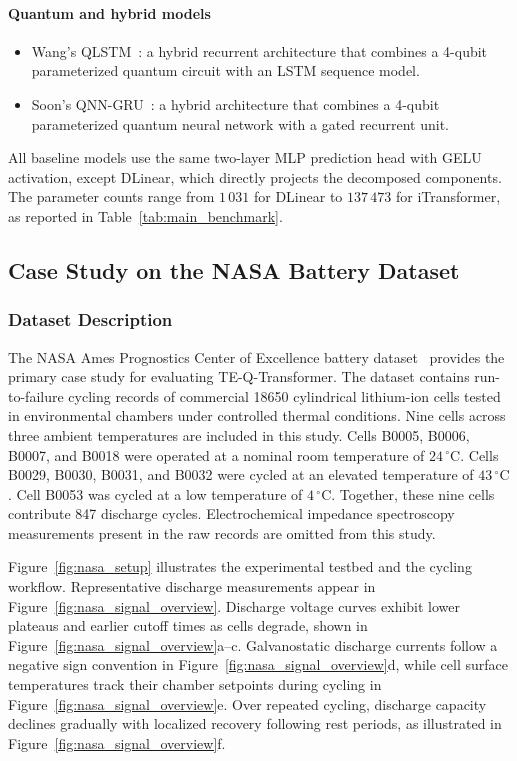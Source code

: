 \documentclass[a4paper,fleqn]{cas-sc}
\begin{document}
\paragraph{Quantum and hybrid models}
\begin{itemize}[leftmargin=*,noitemsep,topsep=2pt]
\item Wang's QLSTM~\citep{wang2026prediction}: a hybrid recurrent architecture that combines a 4-qubit parameterized quantum circuit with an LSTM sequence model.
\item Soon's QNN-GRU~\citep{soon2025hybrid}: a hybrid architecture that combines a 4-qubit parameterized quantum neural network with a gated recurrent unit.
\end{itemize}

All baseline models use the same two-layer MLP prediction head with GELU activation, except DLinear, which directly projects the decomposed components. The parameter counts range from $1\,031$ for DLinear to $137\,473$ for iTransformer, as reported in Table~\ref{tab:main_benchmark}.


\subsection{Case Study on the NASA Battery Dataset}\label{sec:nasa_case}

\subsubsection{Dataset Description}\label{sec:nasa_description}

The NASA Ames Prognostics Center of Excellence battery dataset~\citep{saha2007battery} provides the primary case study for evaluating TE-Q-Transformer. The dataset contains run-to-failure cycling records of commercial 18650 cylindrical lithium-ion cells tested in environmental chambers under controlled thermal conditions. Nine cells across three ambient temperatures are included in this study. Cells B0005, B0006, B0007, and B0018 were operated at a nominal room temperature of $24\,^\circ\mathrm{C}$. Cells B0029, B0030, B0031, and B0032 were cycled at an elevated temperature of $43\,^\circ\mathrm{C}$. Cell B0053 was cycled at a low temperature of $4\,^\circ\mathrm{C}$. Together, these nine cells contribute 847 discharge cycles. Electrochemical impedance spectroscopy measurements present in the raw records are omitted from this study.

Figure~\ref{fig:nasa_setup} illustrates the experimental testbed and the cycling workflow. Representative discharge measurements appear in Figure~\ref{fig:nasa_signal_overview}. Discharge voltage curves exhibit lower plateaus and earlier cutoff times as cells degrade, shown in Figure~\ref{fig:nasa_signal_overview}a--c. Galvanostatic discharge currents follow a negative sign convention in Figure~\ref{fig:nasa_signal_overview}d, while cell surface temperatures track their chamber setpoints during cycling in Figure~\ref{fig:nasa_signal_overview}e. Over repeated cycling, discharge capacity declines gradually with localized recovery following rest periods, as illustrated in Figure~\ref{fig:nasa_signal_overview}f.
\end{document}
